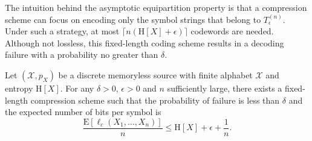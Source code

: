 The intuition behind the asymptotic equipartition property is that a compression scheme can focus on encoding only the symbol strings that belong to $T_{\epsilon}^{(n)}$.
Under such a strategy, at most $\lceil n (\mathrm{H}[X] + \epsilon) \rceil$ codewords are needed.
Although not lossless, this fixed-length coding scheme results in a decoding failure with a probability no greater than $\delta$.

\begin{theorem}
Let $(\mathcal{X}, p_X)$ be a discrete memoryless source with finite alphabet $\mathcal{X}$ and entropy $\mathrm{H}[X]$.
For any $\delta > 0$, $\epsilon > 0$ and $n$ sufficiently large, there exists a fixed-length compression scheme such that the probability of failure is less than $\delta$ and the expected number of bits per symbol is
\begin{equation*}
\frac{\mathrm{E} [\ell_c(X_1, \ldots, X_n)]}{n} \leq \mathrm{H}[X] + \epsilon + \frac{1}{n} .
\end{equation*}
\end{theorem}

